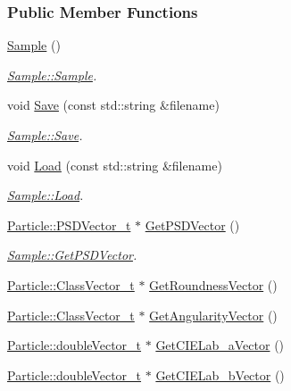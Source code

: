 \subsubsection*{Public Member Functions}
\begin{DoxyCompactItemize}
\item 
\hyperlink{class_soil_analyzer_1_1_sample_a6b7513ef6317fc86181d5b9901d0ce07}{Sample} ()
\begin{DoxyCompactList}\small\item\em \hyperlink{class_soil_analyzer_1_1_sample_a6b7513ef6317fc86181d5b9901d0ce07}{Sample\+::\+Sample}. \end{DoxyCompactList}\item 
void \hyperlink{class_soil_analyzer_1_1_sample_acb0fa4729d078f7c8fba70411469a67d}{Save} (const std\+::string \&filename)
\begin{DoxyCompactList}\small\item\em \hyperlink{class_soil_analyzer_1_1_sample_acb0fa4729d078f7c8fba70411469a67d}{Sample\+::\+Save}. \end{DoxyCompactList}\item 
void \hyperlink{class_soil_analyzer_1_1_sample_afbb2db434d2e0a317c5b056371bf43fe}{Load} (const std\+::string \&filename)
\begin{DoxyCompactList}\small\item\em \hyperlink{class_soil_analyzer_1_1_sample_afbb2db434d2e0a317c5b056371bf43fe}{Sample\+::\+Load}. \end{DoxyCompactList}\item 
\hyperlink{class_soil_analyzer_1_1_particle_aba1003586622fdf1dbc87c0dabc46f1d}{Particle\+::\+P\+S\+D\+Vector\+\_\+t} $\ast$ \hyperlink{class_soil_analyzer_1_1_sample_ae16f0b1abc2872738e25e9d6a865f3f2}{Get\+P\+S\+D\+Vector} ()
\begin{DoxyCompactList}\small\item\em \hyperlink{class_soil_analyzer_1_1_sample_ae16f0b1abc2872738e25e9d6a865f3f2}{Sample\+::\+Get\+P\+S\+D\+Vector}. \end{DoxyCompactList}\item 
\hyperlink{class_soil_analyzer_1_1_particle_ad2038e90ac83a1cbd34a28e8fdefbfdc}{Particle\+::\+Class\+Vector\+\_\+t} $\ast$ \hyperlink{class_soil_analyzer_1_1_sample_af08f7ebab2816d7bd1461ef3be6a1ea7}{Get\+Roundness\+Vector} ()
\item 
\hyperlink{class_soil_analyzer_1_1_particle_ad2038e90ac83a1cbd34a28e8fdefbfdc}{Particle\+::\+Class\+Vector\+\_\+t} $\ast$ \hyperlink{class_soil_analyzer_1_1_sample_a9936205e5975ea3351eb371ec5b8c83f}{Get\+Angularity\+Vector} ()
\item 
\hyperlink{class_soil_analyzer_1_1_particle_a4ae1bf667c41c7df60cc933e9e5f82eb}{Particle\+::double\+Vector\+\_\+t} $\ast$ \hyperlink{class_soil_analyzer_1_1_sample_a3e33c17769503a88ccca6fb5fba05e55}{Get\+C\+I\+E\+Lab\+\_\+a\+Vector} ()
\item 
\hyperlink{class_soil_analyzer_1_1_particle_a4ae1bf667c41c7df60cc933e9e5f82eb}{Particle\+::double\+Vector\+\_\+t} $\ast$ \hyperlink{class_soil_analyzer_1_1_sample_adee51a3ce8bafdab4188721736b7761a}{Get\+C\+I\+E\+Lab\+\_\+b\+Vector} ()
\end{DoxyCompactItemize}
